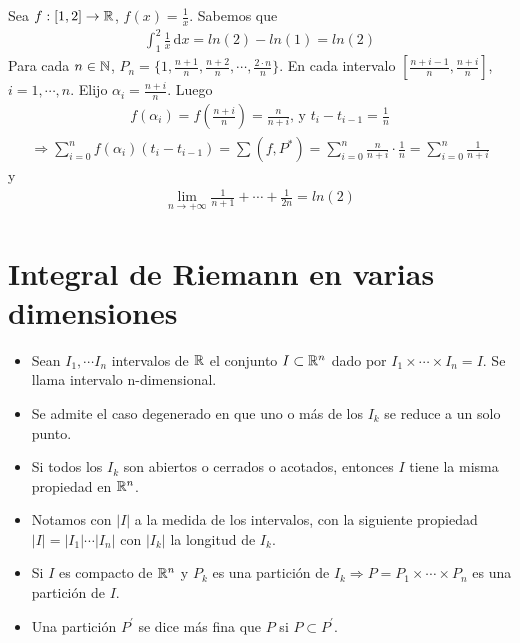 \clearpage

\begin{eg}
  Sea \(f: [1, 2] \to \mathbb{R}\), \(f(x) = \frac{1}{x}\). Sabemos que \begin{align*}\int_1^2 \frac{1}{x} \, \mathrm{d}x = ln(2) - ln(1) = ln(2)\end{align*} Para cada \(n \in \mathbb{N}\), \(P_n = \{1, \frac{n+1}{n}, \frac{n+2}{n}, \cdots, \frac{2 \cdot n}{n}\}\). En cada intervalo \([\frac{n+i-1}{n}, \frac{n+i}{n}]\), \(i = 1, \cdots, n\). Elijo \(\alpha_i = \frac{n+i}{n}\). Luego
  \begin{align*}
    f(\alpha_i) = f(\frac{n+i}{n}) = \frac{n}{n+i} \text{, y } t_i - t_{i-1} = \frac{1}{n}
  \end{align*}
  \begin{align*}
    \Rightarrow \sum_{i = 0}^n f(\alpha_i) (t_i - t_{i-1}) = \sum(f, P^*) = \sum_{i = 0}^n \frac{n}{n+i} \cdot \frac{1}{n} = \sum_{i = 0}^n \frac{1}{n+i}
  \end{align*} y
  \begin{align*}
    \lim_{n \to +\infty} \frac{1}{n+1} + \cdots + \frac{1}{2n} = ln(2)
  \end{align*}
\end{eg}

\section{Integral de Riemann en varias dimensiones}

\begin{itemize}
  \item Sean \(I_1, \cdots I_n\) intervalos de \(\mathbb{R}\) el conjunto \(I \subset \mathbb{R}^n\) dado por \(I_1 \times \cdots \times I_n = I\). Se llama intervalo n-dimensional.
  \item Se admite el caso degenerado en que uno o más de los \(I_k\) se reduce a un solo punto.
  \item Si todos los \(I_k\) son abiertos o cerrados o acotados, entonces \(I\) tiene la misma propiedad en \(\mathbb{R}^n\).
  \item Notamos con \(|I|\) a la medida de los intervalos, con la siguiente propiedad \(|I| = |I_1| \cdots |I_n|\) con \(|I_k|\) la longitud de \(I_k\).
  \item Si \(I\) es compacto de \(\mathbb{R}^n\) y \(P_k\) es una partición de \(I_k \Rightarrow P = P_1 \times \cdots \times P_n\) es una partición de \(I\).
  \item Una partición \(P^{\prime}\) se dice más fina que \(P\) si \(P \subset P^{\prime}\).
\end{itemize}

